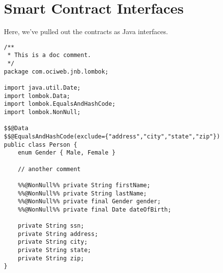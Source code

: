 

\section{Smart Contract Interfaces}

Here, we've pulled out the contracts as Java interfaces. 

\begin{lstlisting}
/**
 * This is a doc comment.
 */
package com.ociweb.jnb.lombok;

import java.util.Date;
import lombok.Data;
import lombok.EqualsAndHashCode;
import lombok.NonNull;

$$@Data
$$@EqualsAndHashCode(exclude={"address","city","state","zip"})
public class Person {
    enum Gender { Male, Female }

    // another comment

    %%@NonNull%% private String firstName;
    %%@NonNull%% private String lastName;
    %%@NonNull%% private final Gender gender;
    %%@NonNull%% private final Date dateOfBirth;

    private String ssn;
    private String address;
    private String city;
    private String state;
    private String zip;
}
\end{lstlisting}